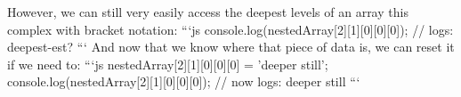 \documentclass{article}%
\begin{document}
However, we can still very easily access the deepest levels of an array this complex with bracket notation:\newline%
```js\newline%
console.log(nestedArray{[}2{]}{[}1{]}{[}0{]}{[}0{]}{[}0{]});\newline%
// logs: deepest{-}est?\newline%
```\newline%
And now that we know where that piece of data is, we can reset it if we need to:\newline%
```js\newline%
nestedArray{[}2{]}{[}1{]}{[}0{]}{[}0{]}{[}0{]} = 'deeper still';\newline%
console.log(nestedArray{[}2{]}{[}1{]}{[}0{]}{[}0{]}{[}0{]});\newline%
// now logs: deeper still\newline%
```\newline%

%
\end{document}
